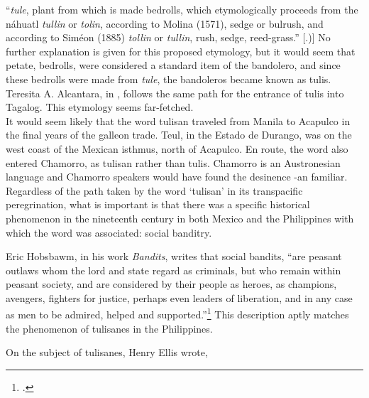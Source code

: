 {\enquote{\textit{tule}, plant from which is made bedrolls, which etymologically proceeds from the n\'ahuatl \textit{tullin} or \textit{tolin}, according to Molina (1571), sedge or bulrush, and according to Sim\'eon (1885) \textit{tollin} or \textit{tullin}, rush, sedge, reed-grass.} [\cite[106, 173]{Hernandez2000}.)]  No further explanation is given for this proposed etymology, but it would seem that petate, bedrolls, were considered a standard item of the bandolero, and since these bedrolls were made from \textit{tule}, the bandoleros became known as tulis. Teresita A. Alcantara, in \cite[6]{Alcantara2008}, follows the same path for the entrance of tulis into Tagalog. This etymology seems far-fetched.\\ 
It would seem likely that the word tulisan traveled from Manila to Acapulco in the final years of the galleon trade. Teul, in the Estado de Durango, was on the west coast of the Mexican isthmus, north of Acapulco. En route, the word also entered Chamorro, as tulisan rather than tulis. Chamorro is an Austronesian language and Chamorro speakers would have found the desinence -an familiar.\\ 
Regardless of the path taken by the word \enquote*{tulisan} in its transpacific peregrination, what is important is that there was a specific historical phenomenon in the nineteenth century in both Mexico and the Philippines with which the word was associated: social banditry.}

Eric Hobsbawm, in his work \textit{Bandits}, writes that social bandits, \enquote{are peasant outlaws whom the lord and state regard as criminals, but who remain within peasant society, and are considered by their people as heroes, as champions, avengers, fighters for justice, perhaps even leaders of liberation, and in any case as men to be admired, helped and supported.}\footcite[20]{Hobsbawm2000} This description aptly matches the phenomenon of tulisanes in the Philippines.

On the subject of tulisanes, Henry Ellis wrote, 


